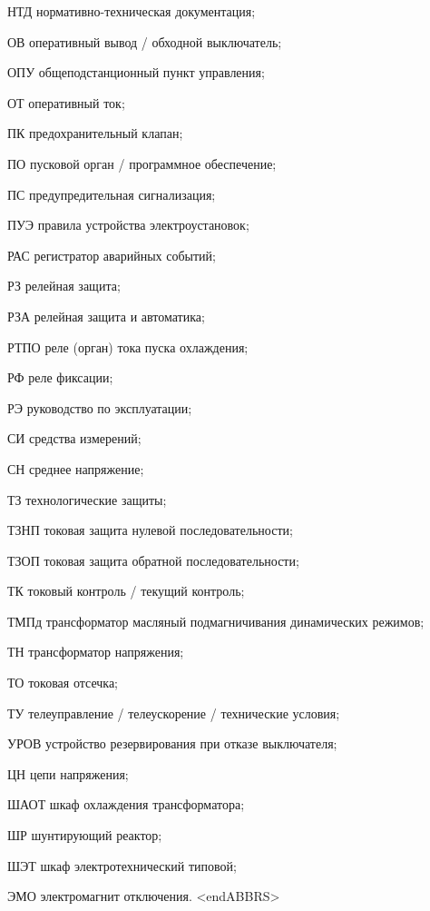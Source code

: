 \begin{list}{}
\item[НТД] нормативно-техническая документация;
\item[ОВ] оперативный вывод / обходной выключатель;
\item[ОПУ] общеподстанционный пункт управления;
\item[ОТ] оперативный ток;
\item[ПК] предохранительный клапан;
\item[ПО] пусковой орган / программное обеспечение;
\item[ПС] предупредительная сигнализация;
\item[ПУЭ] правила устройства электроустановок;
\item[РАС] регистратор аварийных событий;
\item[РЗ] релейная защита;
\item[РЗА] релейная защита и автоматика;
\item[РТПО] реле (орган) тока пуска охлаждения;
\item[РФ] реле фиксации;
\item[РЭ] руководство по эксплуатации;
\item[СИ] средства измерений;
\item[СН] среднее напряжение;
\item[ТЗ] технологические защиты;
\item[ТЗНП] токовая защита нулевой последовательности;
\item[ТЗОП] токовая защита обратной последовательности;
\item[ТК] токовый контроль / текущий контроль;
\item[ТМПд] трансформатор масляный подмагничивания динамических режимов;
\item[ТН] трансформатор напряжения;
\item[ТО] токовая отсечка;
\item[ТУ] телеуправление / телеускорение / технические условия;
\item[УРОВ] устройство резервирования при отказе выключателя;
\item[ЦН] цепи напряжения;
\item[ШАОТ] шкаф охлаждения трансформатора;
\item[ШР] шунтирующий реактор;
\item[ШЭТ] шкаф электротехнический типовой;
\item[ЭМО] электромагнит отключения.
{\color{white}\fontsize{0.1pt}{0.1pt}\selectfont<endABBRS>}
\end{list}
